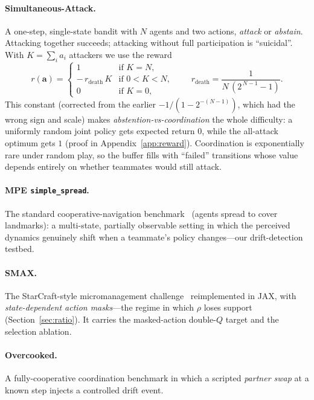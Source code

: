 \documentclass[sigconf]{aamas}
\begin{document}
\paragraph{Simultaneous-Attack.} A one-step, single-state bandit with $N$ agents
and two actions, \emph{attack} or \emph{abstain}. Attacking together succeeds;
attacking without full participation is ``suicidal''. With $K=\sum_i a_i$
attackers we use the reward
\begin{equation}
\label{eq:sim-reward}
r(\mathbf{a})=
\begin{cases}
1 & \text{if } K=N,\\[2pt]
-\,r_{\mathrm{death}}\,K & \text{if } 0<K<N,\\[2pt]
0 & \text{if } K=0,
\end{cases}
\qquad
r_{\mathrm{death}}=\frac{1}{N\,(2^{\,N-1}-1)} .
\end{equation}
This constant (corrected from the earlier $-1/(1-2^{-(N-1)})$, which had the
wrong sign and scale) makes \emph{abstention-vs-coordination} the whole
difficulty: a uniformly random joint policy gets expected return $0$, while the
all-attack optimum gets $1$ (proof in Appendix~\ref{app:reward}). Coordination is
exponentially rare under random play, so the buffer fills with ``failed''
transitions whose value depends entirely on whether teammates would still attack.

\paragraph{MPE \texttt{simple\_spread}.} The standard cooperative-navigation
benchmark~\cite{lowe2017multi} (agents spread to cover landmarks): a multi-state,
partially observable setting in which the perceived dynamics genuinely shift when a
teammate's policy changes---our drift-detection testbed.

\paragraph{SMAX.} The {StarCraft}-style micromanagement
challenge~\cite{samvelyan2019starcraft} reimplemented in JAX, with
\emph{state-dependent action masks}---the regime in which $\rho$ loses support
(Section~\ref{sec:ratio}). It carries the masked-action double-$Q$ target and the
selection ablation.

\paragraph{Overcooked.} A fully-cooperative coordination benchmark in which a
scripted \emph{partner swap} at a known step injects a controlled drift event.
\end{document}
